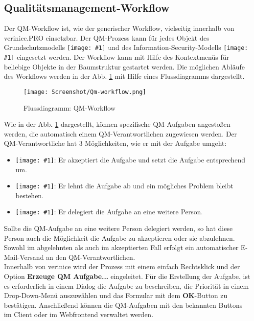 \documentclass[a4paper,10pt]{book}
\newcommand{\icon}[1]{\texttt{[image: \#1]}}
\begin{document}
\subsection{Qualitätsmanagement-Workflow}
Der QM-Workflow ist, wie der generischer Workflow, vielseitig innerhalb von verinice.\textsc{PRO} einsetzbar. Der QM-Prozess kann für jedes Objekt des
Grundschutzmodells \icon{Icon/GS_Modell.png} und des Information-Security-Modells \icon{Icon/Informationssicherheitsmodell.png}
eingesetzt werden. Der Workflow kann mit Hilfe des Kontextmenüs für beliebige Objekte in der Baumstruktur gestartet werden.
Die möglichen Abläufe des Workflows werden in der Abb. \ref{Flussdiagramm: QM-Workflow} mit Hilfe eines Flussdiagramms dargestellt.
\begin{figure}[htb!]
  \centering
  \texttt{[image: Screenshot/Qm-workflow.png]}
  \caption{\label{Flussdiagramm: QM-Workflow} Flussdiagramm: QM-Workflow}
\end{figure}
Wie in der Abb. \ref{Flussdiagramm: QM-Workflow} dargestellt, können spezifische QM-Aufgaben angestoßen werden, die automatisch einem QM-Verantwortlichen zugewiesen
werden. Der QM-Verantwortliche hat 3 Möglichkeiten, wie er mit der Aufgabe umgeht:
\begin{itemize}
\item \icon{Icon/Akzeptieren.png}: Er akzeptiert die Aufgabe und setzt die Aufgabe entsprechend um.
\item \icon{Icon/Ablehnen.png}: Er lehnt die Aufgabe ab und ein mögliches Problem bleibt bestehen.
\item \icon{Icon/waehle_person.png}: Er delegiert die Aufgabe an eine weitere Person.
\end{itemize}
Sollte die QM-Aufgabe an eine weitere Person delegiert werden, so hat diese Person auch die Möglichkeit die Aufgabe zu akzeptieren oder sie
abzulehnen. Sowohl im abgelehnten als auch im akzeptierten Fall erfolgt ein automatischer E-Mail-Versand an den QM-Verantwortlichen.
\newline\\
Innerhalb von verinice wird der Prozess mit einem einfach Rechtsklick und der Option \textbf{Erzeuge QM Aufgabe...} eingeleitet. Für die Erstellung der Aufgabe,
ist es erforderlich in einem Dialog die Aufgabe zu beschreiben, die Priorität in einem Drop-Down-Menü auszuwählen und das Formular mit dem \textbf{OK}-Button zu bestätigen.
Anschließend können die QM-Aufgaben mit den bekannten Buttons im Client oder im Webfrontend verwaltet werden.
\end{document}
